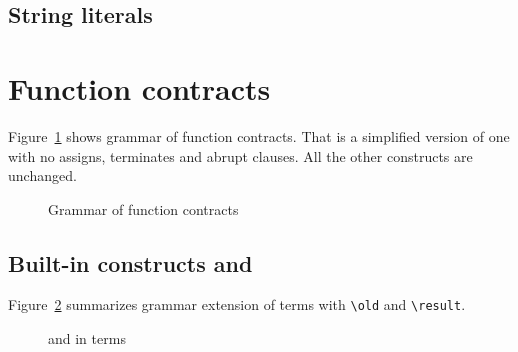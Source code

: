 

\subsection{String literals}

\nodiff


\section{Function contracts}
\label{sec:fn-behavior}


Figure~\ref{fig:gram:contracts} shows grammar of function contracts. That is a
simplified version of \acsl one with no assigns, terminates and abrupt
clauses. All the other constructs are unchanged.
\begin{figure}[htbp]
  \begin{cadre}
      
   \end{cadre}
    \caption{Grammar of function contracts}
  \label{fig:gram:contracts}
\end{figure}


\subsection{Built-in constructs %
  \texorpdfstring{\old}{\textbackslash{}old} %
 and \texorpdfstring{\result}{\textbackslash{}result}}

\nodiff

Figure~\ref{fig:gram:oldandresult} summarizes grammar extension of terms with
\lstinline|\old| and \lstinline|\result|.
\begin{figure}[htbp]
  \begin{cadre}
      
    \end{cadre}
    \caption{\protect\old and \protect\result in terms}
  \label{fig:gram:oldandresult}
\end{figure}


